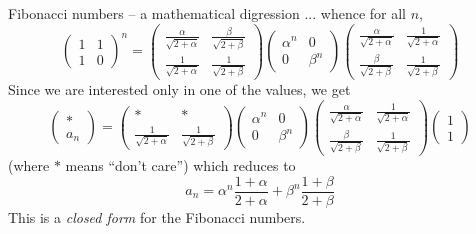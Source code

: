 \documentclass[presentation]{beamer}
\begin{document}
\begin{frame}{Fibonacci numbers -- a mathematical digression}
  ... whence for all $n$,
\begin{equation*}
  \left(\begin{array}{cc}
    1 & 1 \\ 1 & 0
  \end{array}\right)^n
  =
  \left(\begin{array}{cc}
      \frac{\alpha}{\sqrt{2+\alpha}} & \frac{\beta}{\sqrt{2+\beta}} \\
      \frac{1}{\sqrt{2+\alpha}}   &   \frac{1}{\sqrt{2+\beta}}
  \end{array}\right)
  \left(\begin{array}{cc}
    \alpha^n & 0 \\
    0 & \beta^n
  \end{array}\right)
  \left(\begin{array}{cc}
      \frac{\alpha}{\sqrt{2+\alpha}} &  \frac{1}{\sqrt{2+\alpha}} \\
      \frac{\beta}{\sqrt{2+\beta}}   &   \frac{1}{\sqrt{2+\beta}}
  \end{array}\right)
\end{equation*}
Since we are interested only in one of the values, we get
\begin{equation*}
  \left(\begin{array}{c} * \\ a_n \end{array}\right)
  =
  \left(\begin{array}{cc}
      * & * \\
      \frac{1}{\sqrt{2+\alpha}}   &   \frac{1}{\sqrt{2+\beta}}
  \end{array}\right)
  \left(\begin{array}{cc}
    \alpha^n & 0 \\
    0 & \beta^n
  \end{array}\right)
  \left(\begin{array}{cc}
      \frac{\alpha}{\sqrt{2+\alpha}} &  \frac{1}{\sqrt{2+\alpha}} \\
      \frac{\beta}{\sqrt{2+\beta}}   &   \frac{1}{\sqrt{2+\beta}}
  \end{array}\right)
  \left(\begin{array}{c} 1 \\ 1\end{array}\right)
\end{equation*}
(where $*$ means ``don't care'') which reduces to
\begin{equation*}
  a_n=\alpha^n\frac{1+\alpha}{2+\alpha}+\beta^n\frac{1+\beta}{2+\beta}
\end{equation*}
This is a \emph{closed form} for the Fibonacci numbers.
\end{frame}
\end{document}
